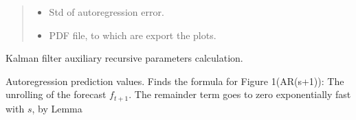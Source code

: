 \documentclass[letterpaper,10pt,english]{sphinxmanual}
\begin{document}
\begin{fulllineitems}
\begin{quote}
\begin{description}
\begin{itemize}
\item {} 
\sphinxAtStartPar
{} \textendash{} Std of auto\sphinxhyphen{}regression error.

\item {} 
\sphinxAtStartPar
{} \textendash{} PDF file, to which are export the plots.

\end{itemize}

\end{description}\end{quote}

\end{fulllineitems}


\begin{fulllineitems}
\label{\detokenize{LDS:LDS.OnlineLDS_library.pre_comp_filter_params}}
\sphinxAtStartPar
Kalman filter auxiliary recursive parameters calculation.

\end{fulllineitems}


\begin{fulllineitems}
\label{\detokenize{LDS:LDS.OnlineLDS_library.prediction}}
\sphinxAtStartPar
Auto\sphinxhyphen{}regression prediction values.
Finds the formula for Figure 1(AR(s+1)):
The unrolling of the forecast \(f_{t+1}\).
The remainder term goes to zero exponentially fast with \(s\), by Lemma

\end{fulllineitems}
\end{document}
